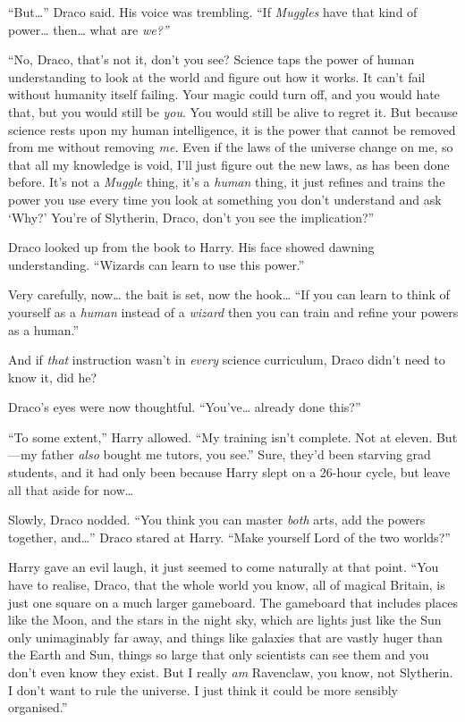 ``But\ldots{}'' Draco said. His voice was trembling. ``If \emph{Muggles}
have that kind of power\ldots{} then\ldots{} what are \emph{we?''}

``No, Draco, that's not it, don't you see? Science taps the power of
human understanding to look at the world and figure out how it works. It
can't fail without humanity itself failing. Your magic could turn off,
and you would hate that, but you would still be \emph{you}. You would
still be alive to regret it. But because science rests upon my human
intelligence, it is the power that cannot be removed from me without
removing \emph{me.} Even if the laws of the universe change on me, so
that all my knowledge is void, I'll just figure out the new laws, as has
been done before. It's not a \emph{Muggle} thing, it's a \emph{human}
thing, it just refines and trains the power you use every time you look
at something you don't understand and ask `Why?' You're of Slytherin,
Draco, don't you see the implication?''

Draco looked up from the book to Harry. His face showed dawning
understanding. ``Wizards can learn to use this power.''

Very carefully, now\ldots{} the bait is set, now the hook\ldots{} ``If
you can learn to think of yourself as a \emph{human} instead of a
\emph{wizard} then you can train and refine your powers as a human.''

And if \emph{that} instruction wasn't in \emph{every} science
curriculum, Draco didn't need to know it, did he?

Draco's eyes were now thoughtful. ``You've\ldots{} already done this?''

``To some extent,'' Harry allowed. ``My training isn't complete. Not at
eleven. But---my father \emph{also} bought me tutors, you see.'' Sure,
they'd been starving grad students, and it had only been because Harry
slept on a 26-hour cycle, but leave all that aside for now\ldots{}

Slowly, Draco nodded. ``You think you can master \emph{both} arts, add
the powers together, and\ldots{}'' Draco stared at Harry. ``Make
yourself Lord of the two worlds?''

Harry gave an evil laugh, it just seemed to come naturally at that
point. ``You have to realise, Draco, that the whole world you know, all
of magical Britain, is just one square on a much larger gameboard. The
gameboard that includes places like the Moon, and the stars in the night
sky, which are lights just like the Sun only unimaginably far away, and
things like galaxies that are vastly huger than the Earth and Sun,
things so large that only scientists can see them and you don't even
know they exist. But I really \emph{am} Ravenclaw, you know, not
Slytherin. I don't want to rule the universe. I just think it could be
more sensibly organised.''

